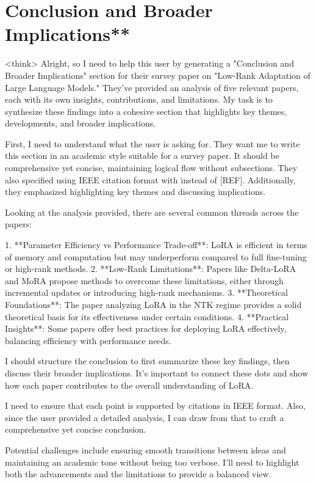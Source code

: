 \documentclass[conference]{IEEEtran}
\begin{document}
\section{Conclusion and Broader Implications**}
<think>
Alright, so I need to help this user by generating a "Conclusion and Broader Implications" section for their survey paper on "Low-Rank Adaptation of Large Language Models." They've provided an analysis of five relevant papers, each with its own insights, contributions, and limitations. My task is to synthesize these findings into a cohesive section that highlights key themes, developments, and broader implications.

First, I need to understand what the user is asking for. They want me to write this section in an academic style suitable for a survey paper. It should be comprehensive yet concise, maintaining logical flow without subsections. They also specified using IEEE citation format with \cite{} instead of [REF]. Additionally, they emphasized highlighting key themes and discussing implications.

Looking at the analysis provided, there are several common threads across the papers:

1. **Parameter Efficiency vs Performance Trade-off**: LoRA is efficient in terms of memory and computation but may underperform compared to full fine-tuning or high-rank methods.
2. **Low-Rank Limitations**: Papers like Delta-LoRA and MoRA propose methods to overcome these limitations, either through incremental updates or introducing high-rank mechanisms.
3. **Theoretical Foundations**: The paper analyzing LoRA in the NTK regime provides a solid theoretical basis for its effectiveness under certain conditions.
4. **Practical Insights**: Some papers offer best practices for deploying LoRA effectively, balancing efficiency with performance needs.

I should structure the conclusion to first summarize these key findings, then discuss their broader implications. It's important to connect these dots and show how each paper contributes to the overall understanding of LoRA.

I need to ensure that each point is supported by citations in IEEE format. Also, since the user provided a detailed analysis, I can draw from that to craft a comprehensive yet concise conclusion.

Potential challenges include ensuring smooth transitions between ideas and maintaining an academic tone without being too verbose. I'll need to highlight both the advancements and the limitations to provide a balanced view.
\end{document}
